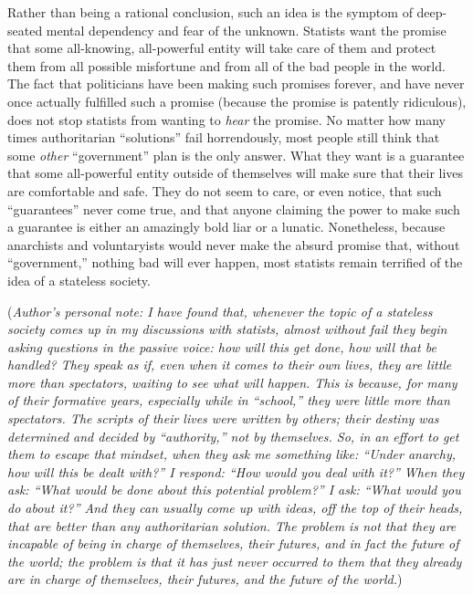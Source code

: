 \documentclass{book}
\begin{document}
Rather than being a rational conclusion, such an idea is the symptom of deep-seated mental dependency and fear of the unknown. Statists want the promise that some all-knowing, all-powerful entity will take care of them and protect them from all possible misfortune and from all of the bad people in the world. The fact that politicians have been making such promises forever, and have never once actually fulfilled such a promise (because the promise is patently ridiculous), does not stop statists from wanting to \emph{hear} the promise. No matter how many times authoritarian \enquote{solutions} fail horrendously, most people still think that some \emph{other} \enquote{government} plan is the only answer. What they want is a guarantee that some all-powerful entity outside of themselves will make sure that their lives are comfortable and safe. They do not seem to care, or even notice, that such \enquote{guarantees} never come true, and that anyone claiming the power to make such a guarantee is either an amazingly bold liar or a lunatic. Nonetheless, because anarchists and voluntaryists would never make the absurd promise that, without \enquote{government,} nothing bad will ever happen, most statists remain terrified of the idea of a stateless society.

(\emph{Author's personal note: I have found that, whenever the topic of a stateless society comes up in my discussions with statists, almost without fail they begin asking questions in the passive voice: how will this get done, how will that be handled? They speak as if, even when it comes to their own lives, they are little more than spectators, waiting to see what will happen. This is because, for many of their formative years, especially while in \enquote{school,} they were little more than spectators. The scripts of their lives were written by others; their destiny was determined and decided by \enquote{authority,} not by themselves. So, in an effort to get them to escape that mindset, when they ask me something like: \enquote{Under anarchy, how will this be dealt with?} I respond: \enquote{How would you deal with it?} When they ask: \enquote{What would be done about this potential problem?} I ask: \enquote{What would you do about it?} And they can usually come up with ideas, off the top of their heads, that are better than any authoritarian solution. The problem is not that they are incapable of being in charge of themselves, their futures, and in fact the future of the world; the problem is that it has just never occurred to them that they already are in charge of themselves, their futures, and the future of the world.})
\end{document}
